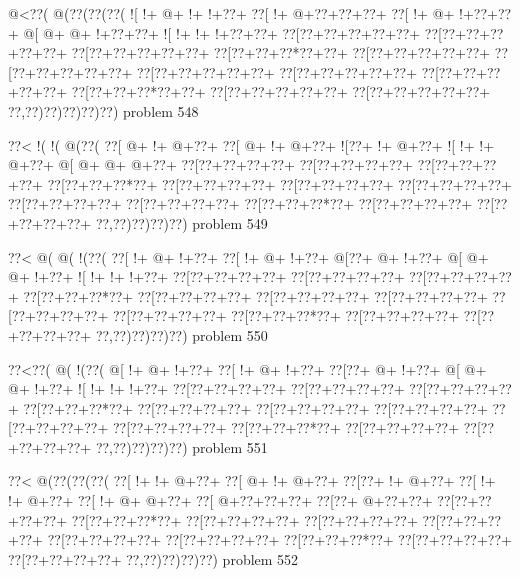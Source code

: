 \vbox{\vbox{\goo
\- @<\0??(\- @(\0??(\0??(\0??(
\- ![\- !+\- @+\- !+\- !+\0??+
\0??[\- !+\- @+\0??+\0??+\0??+
\0??[\- !+\- @+\- !+\0??+\0??+
\- @[\- @+\- @+\- !+\0??+\0??+
\- ![\- !+\- !+\- !+\0??+\0??+
\0??[\0??+\0??+\0??+\0??+\0??+
\0??[\0??+\0??+\0??+\0??+\0??+
\0??[\0??+\0??+\0??+\0??+\0??+
\0??[\0??+\0??+\0??*\0??+\0??+
\0??[\0??+\0??+\0??+\0??+\0??+
\0??[\0??+\0??+\0??+\0??+\0??+
\0??[\0??+\0??+\0??+\0??+\0??+
\0??[\0??+\0??+\0??+\0??+\0??+
\0??[\0??+\0??+\0??+\0??+\0??+
\0??[\0??+\0??+\0??*\0??+\0??+
\0??[\0??+\0??+\0??+\0??+\0??+
\0??[\0??+\0??+\0??+\0??+\0??+
\0??,\0??)\0??)\0??)\0??)\0??)
}
\hfil problem 548\hfil\break
}

\vbox{\vbox{\goo
\0??<\- !(\- !(\- @(\0??(
\0??[\- @+\- !+\- @+\0??+
\0??[\- @+\- !+\- @+\0??+
\- ![\0??+\- !+\- @+\0??+
\- ![\- !+\- !+\- @+\0??+
\- @[\- @+\- @+\- @+\0??+
\0??[\0??+\0??+\0??+\0??+
\0??[\0??+\0??+\0??+\0??+
\0??[\0??+\0??+\0??+\0??+
\0??[\0??+\0??+\0??*\0??+
\0??[\0??+\0??+\0??+\0??+
\0??[\0??+\0??+\0??+\0??+
\0??[\0??+\0??+\0??+\0??+
\0??[\0??+\0??+\0??+\0??+
\0??[\0??+\0??+\0??+\0??+
\0??[\0??+\0??+\0??*\0??+
\0??[\0??+\0??+\0??+\0??+
\0??[\0??+\0??+\0??+\0??+
\0??,\0??)\0??)\0??)\0??)
}
\hfil problem 549\hfil\break
}

\vbox{\vbox{\goo
\0??<\- @(\- @(\- !(\0??(
\0??[\- !+\- @+\- !+\0??+
\0??[\- !+\- @+\- !+\0??+
\- @[\0??+\- @+\- !+\0??+
\- @[\- @+\- @+\- !+\0??+
\- ![\- !+\- !+\- !+\0??+
\0??[\0??+\0??+\0??+\0??+
\0??[\0??+\0??+\0??+\0??+
\0??[\0??+\0??+\0??+\0??+
\0??[\0??+\0??+\0??*\0??+
\0??[\0??+\0??+\0??+\0??+
\0??[\0??+\0??+\0??+\0??+
\0??[\0??+\0??+\0??+\0??+
\0??[\0??+\0??+\0??+\0??+
\0??[\0??+\0??+\0??+\0??+
\0??[\0??+\0??+\0??*\0??+
\0??[\0??+\0??+\0??+\0??+
\0??[\0??+\0??+\0??+\0??+
\0??,\0??)\0??)\0??)\0??)
}
\hfil problem 550\hfil\break
}

\vbox{\vbox{\goo
\0??<\0??(\- @(\- !(\0??(
\- @[\- !+\- @+\- !+\0??+
\0??[\- !+\- @+\- !+\0??+
\0??[\0??+\- @+\- !+\0??+
\- @[\- @+\- @+\- !+\0??+
\- ![\- !+\- !+\- !+\0??+
\0??[\0??+\0??+\0??+\0??+
\0??[\0??+\0??+\0??+\0??+
\0??[\0??+\0??+\0??+\0??+
\0??[\0??+\0??+\0??*\0??+
\0??[\0??+\0??+\0??+\0??+
\0??[\0??+\0??+\0??+\0??+
\0??[\0??+\0??+\0??+\0??+
\0??[\0??+\0??+\0??+\0??+
\0??[\0??+\0??+\0??+\0??+
\0??[\0??+\0??+\0??*\0??+
\0??[\0??+\0??+\0??+\0??+
\0??[\0??+\0??+\0??+\0??+
\0??,\0??)\0??)\0??)\0??)
}
\hfil problem 551\hfil\break
}

\vbox{\vbox{\goo
\0??<\- @(\0??(\0??(\0??(
\0??[\- !+\- !+\- @+\0??+
\0??[\- @+\- !+\- @+\0??+
\0??[\0??+\- !+\- @+\0??+
\0??[\- !+\- !+\- @+\0??+
\0??[\- !+\- @+\- @+\0??+
\0??[\- @+\0??+\0??+\0??+
\0??[\0??+\- @+\0??+\0??+
\0??[\0??+\0??+\0??+\0??+
\0??[\0??+\0??+\0??*\0??+
\0??[\0??+\0??+\0??+\0??+
\0??[\0??+\0??+\0??+\0??+
\0??[\0??+\0??+\0??+\0??+
\0??[\0??+\0??+\0??+\0??+
\0??[\0??+\0??+\0??+\0??+
\0??[\0??+\0??+\0??*\0??+
\0??[\0??+\0??+\0??+\0??+
\0??[\0??+\0??+\0??+\0??+
\0??,\0??)\0??)\0??)\0??)
}
\hfil problem 552\hfil\break
}


